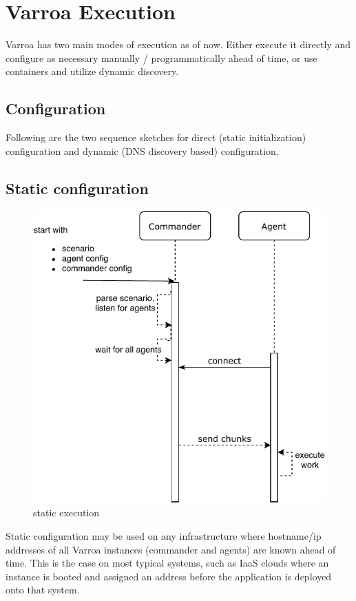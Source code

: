 \chapter{Varroa Execution}

Varroa has two main modes of execution as of now. Either execute it directly and configure as necessary manually / programmatically ahead of time, or use containers and utilize dynamic discovery.

\section{Configuration}
Following are the two sequence sketches for direct (static initialization) configuration and dynamic (DNS discovery based) configuration.

\section{Static configuration}
\begin{figure}[h]
\begin{center}
\includegraphics[scale=0.65]{Resources/PDF/ExecutionStaticInit}
\caption{static execution}
\end{center}
\end{figure}

Static configuration may be used on any infrastructure where hostname/ip addresses of all Varroa instances (commander and agents) are known ahead of time. This is the case on most typical systems, such as IaaS clouds where an instance is booted and assigned an address before the application is deployed onto that system.

